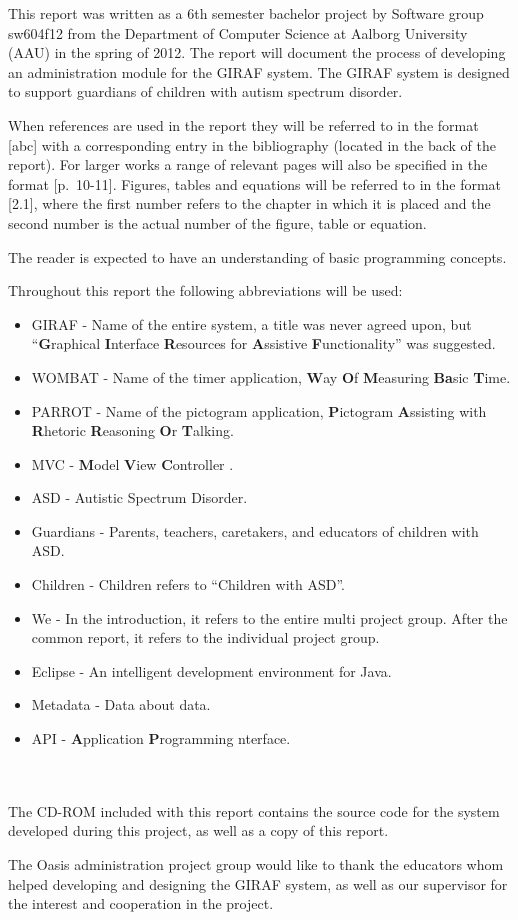 This report was written as a 6th semester bachelor project by Software group sw604f12 from the Department of Computer Science at Aalborg University (AAU) in the spring of 2012. The report will document the process of developing an administration module for the GIRAF system. The GIRAF system is designed to support guardians of children with autism spectrum disorder.

When references are used in the report they will be referred to in the format [abc] with a corresponding entry in the bibliography (located in the back of the report). For larger works a range of relevant pages will also be specified in the format [p.~10-11]. Figures, tables and equations will be referred to in the format [2.1], where the first number refers to the chapter in which it is placed and the second number is the actual number of the figure, table or equation.

The reader is expected to have an understanding of basic programming concepts.

Throughout this report the following abbreviations will be used:

\begin{itemize}
	\item GIRAF - Name of the entire system, a title was never agreed upon, but ``\textbf{G}raphical
	\textbf{I}nterface \textbf{R}esources for \textbf{A}ssistive \textbf{F}unctionality'' was suggested.
	\item WOMBAT - Name of the timer application, \textbf{W}ay \textbf{O}f \textbf{M}easuring \textbf{Ba}sic \textbf{T}ime. 
	\item PARROT - Name of the pictogram application, \textbf{P}ictogram \textbf{A}ssisting with \textbf{R}hetoric \textbf{R}easoning \textbf{O}r \textbf{T}alking.
	\item MVC - \textbf{M}odel \textbf{V}iew \textbf{C}ontroller \cite{MVC}.
	\item ASD - Autistic Spectrum Disorder.
	\item Guardians - Parents, teachers, caretakers, and educators of children with ASD.
	\item Children - Children refers to ``Children with ASD''.
	\item We - In the introduction, it refers to the entire multi project group. After the common report, it refers to the individual project group.
	\item Eclipse - An intelligent development environment for Java.
	\item Metadata - Data about data.
	\item API - \textbf{A}pplication \textbf{P}rogramming nterface.
\end{itemize}

\\ \\

The CD-ROM included with this report contains the source code for the system developed during this project, as well as a copy of this report.

The Oasis administration project group would like to thank the educators whom helped developing and designing the GIRAF system, as well as our supervisor for the interest and cooperation in the project.